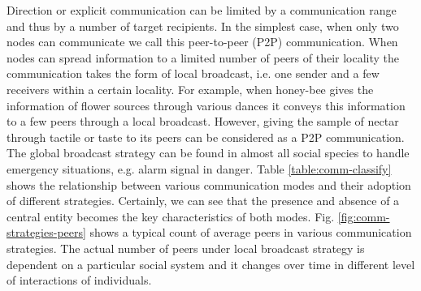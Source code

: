 Direction or explicit communication can be limited by a communication range and thus by a number of target recipients. In the simplest case, when only two nodes can communicate we call this peer-to-peer (P2P) communication. When nodes can spread information to a limited number of peers of their locality the communication takes the form of local broadcast, i.e. one sender and a few receivers within a certain locality. For example, when honey-bee gives the information of flower sources through various dances it conveys this information to a few peers through a local broadcast. However, giving the sample of nectar through tactile or taste to its peers can be considered as a P2P communication. The global broadcast strategy can be found in almost all social species to handle emergency situations, e.g. alarm signal in danger. Table \ref{table:comm-classify}  shows the relationship between various communication modes and their adoption of different strategies. Certainly, we can see that the presence and absence of a central entity becomes the key characteristics of both modes. Fig. \ref {fig:comm-strategies-peers} shows a typical count of average peers in various communication strategies. The actual number of peers under local broadcast strategy is dependent on a particular social system and it changes over time in different level of interactions of individuals. 
